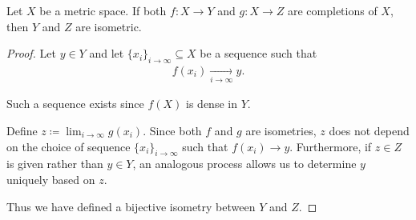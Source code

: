 \begin{proposition}\label{thm:metric_space_completion_uniqueness}
  Let $X$ be a metric space. If both $f: X \to Y$ and $g: X \to Z$ are completions of $X$, then $Y$ and $Z$ are isometric.
\end{proposition}
\begin{proof}
  Let $y \in Y$ and let $\{ x_i \}_{i \to \infty} \subseteq X$ be a sequence such that
  \begin{align*}
    f(x_i) \xrightarrow[i \to \infty]{} y.
  \end{align*}

  Such a sequence exists since $f(X)$ is dense in $Y$.

  Define $z \coloneqq \lim_{i \to \infty} g(x_i)$. Since both $f$ and $g$ are isometries, $z$ does not depend on the choice of sequence $\{ x_i \}_{i \to \infty}$ such that $f(x_i) \to y$. Furthermore, if $z \in Z$ is given rather than $y \in Y$, an analogous process allows us to determine $y$ uniquely based on $z$.

  Thus we have defined a bijective isometry between $Y$ and $Z$.
\end{proof}
